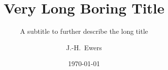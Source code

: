 \documentclass[10pt,t]{beamer}
\title[Short Title]{Very Long Boring Title}
\author[Ewers]{J.-H.~Ewers\inst{1}}
\subtitle{A subtitle to further describe the long title}
\institute[ASRD]{
  \inst{1}
  Aerospace Sciences Research Division\\
  University of Glasgow}
\date{\today}
\begin{document}
\begin{noheadline}
\frame{\titlepage}
\end{noheadline}
	




\end{document}
